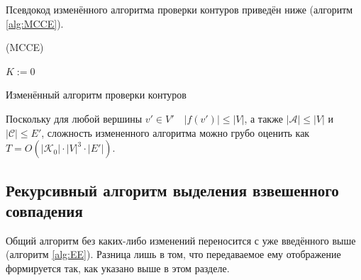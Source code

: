 Псевдокод изменённого алгоритма проверки контуров приведён ниже (алгоритм \ref{alg:MCCE}).

\begin{algorithm}[H]
	\Large
	\Begin(MCCE){
		$K := 0$
		
	}
	
	\caption{Изменённый алгоритм проверки контуров}
	\label{alg:MCCE}
\end{algorithm}

Поскольку для любой вершины $v' \in V' \quad |f(v')| \le |V|$, а также $|\mathcal{A}| \le |V|$ и $|\mathcal{C}| \le E'$, сложность измененного алгоритма можно грубо оценить как $T = O(|\mathcal{K}_0| \cdot |V|^3 \cdot |E'|)$.

\subsection{Рекурсивный алгоритм выделения взвешенного совпадения} \label{ssec:recalg}

Общий алгоритм без каких-либо изменений переносится с уже введённого выше (алгоритм \ref{alg:EE}). Разница лишь в том, что передаваемое ему отображение формируется так, как указано выше в этом разделе.

